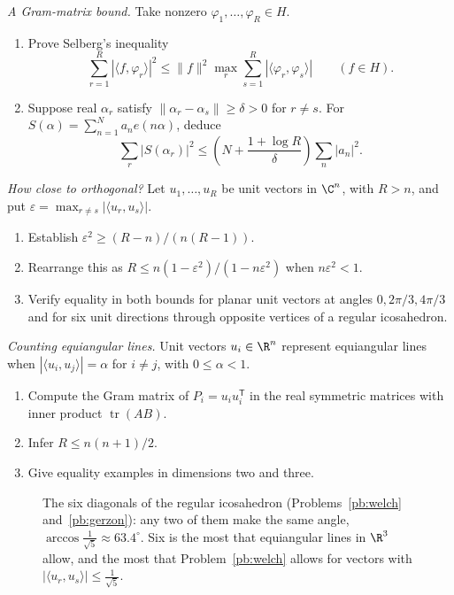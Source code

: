 \begin{exercise}[$\star$]\label{pb:selberg}
\emph{A Gram-matrix bound.} Take nonzero $\varphi_1,\ldots,\varphi_R\in H$.
\begin{enumerate}[label=(\alph*)]
\item Prove Selberg's inequality
\[\sum_{r=1}^R|\langle f,\varphi_r\rangle|^2\le\|f\|^2\max_r\sum_{s=1}^R|\langle\varphi_r,\varphi_s\rangle|\qquad(f\in H).\]
\item Suppose real $\alpha_r$ satisfy $\|\alpha_r-\alpha_s\|\ge\delta>0$ for $r\ne s$. For $S(\alpha)=\sum_{n=1}^Na_ne(n\alpha)$, deduce
\[\sum_r|S(\alpha_r)|^2\le\left(N+\frac{1+\log R}{\delta}\right)\sum_n|a_n|^2.\]
\end{enumerate}
\end{exercise}
\begin{exercise}[$\star\star$]\label{pb:welch}
\emph{How close to orthogonal?} Let $u_1,\ldots,u_R$ be unit vectors in $\C^n$, with $R>n$, and put $\varepsilon=\max_{r\ne s}|\langle u_r,u_s\rangle|$.
\begin{enumerate}[label=(\alph*)]
\item Establish $\varepsilon^2\ge(R-n)/(n(R-1))$.
\item Rearrange this as $R\le n(1-\varepsilon^2)/(1-n\varepsilon^2)$ when $n\varepsilon^2<1$.
\item Verify equality in both bounds for planar unit vectors at angles $0,2\pi/3,4\pi/3$ and for six unit directions through opposite vertices of a regular icosahedron.
\end{enumerate}
\end{exercise}
\begin{exercise}[$\star\star$]\label{pb:gerzon}
\emph{Counting equiangular lines.} Unit vectors $u_i\in\R^n$ represent equiangular lines when $|\langle u_i,u_j\rangle|=\alpha$ for $i\ne j$, with $0\le\alpha<1$.
\begin{enumerate}[label=(\alph*)]
\item Compute the Gram matrix of $P_i=u_iu_i^{\mathsf T}$ in the real symmetric matrices with inner product $\operatorname{tr}(AB)$.
\item Infer $R\le n(n+1)/2$.
\item Give equality examples in dimensions two and three.
\end{enumerate}
\end{exercise}
\begin{figure}[ht]
\centering
{}
\caption{The six diagonals of the regular icosahedron (Problems~\ref{pb:welch} and~\ref{pb:gerzon}): any two of them make the same angle,
$\arccos\frac1{\sqrt5}\approx63.4^\circ$. Six is the most that equiangular lines in $\R^3$ allow, and the most that Problem~\ref{pb:welch}
allows for vectors with $|\langle u_r,u_s\rangle|\le\frac1{\sqrt5}$.}\label{fig:icosa}
\end{figure}

